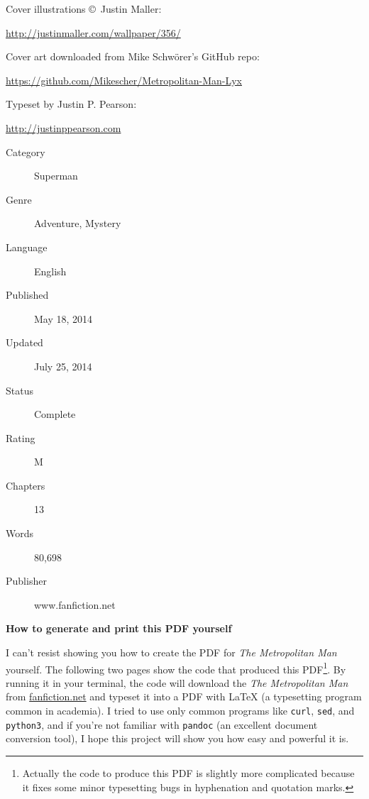 \documentclass[ebook,12pt]{memoir}
\begin{document}
\vspace{.2in}

\noindent Cover illustrations \copyright\ Justin Maller:

\url{http://justinmaller.com/wallpaper/356/}

\vspace{.2in}

\noindent Cover art downloaded from Mike Schw\"orer's GitHub repo:

\url{https://github.com/Mikescher/Metropolitan-Man-Lyx}

\vspace{.2in}

\noindent Typeset by Justin P. Pearson:

\url{http://justinppearson.com}


\vfill

\begin{description}
    \item[Category] Superman
    \item[Genre] Adventure, Mystery 
    \item[Language] English 
    \item[Published] May 18, 2014
    \item[Updated] July 25, 2014
    \item[Status] Complete
    \item[Rating] M 
    \item[Chapters] 13 
    \item[Words] 80,698
    \item[Publisher] www.fanfiction.net 
\end{description}

\normalsize
\cleartorecto


\thispagestyle{empty}

\vspace*{2in}

\textbf{How to generate and print this PDF yourself}

\vspace*{.5cm}

\footnotesize

I can't resist showing you how to create the PDF for \emph{The Metropolitan Man} yourself. 
The following two pages show the code that produced this 
PDF\footnote{ \tiny{Actually the code to produce this PDF is slightly more complicated 
because it fixes some minor typesetting bugs in hyphenation and quotation marks.}}. 
By running it in your terminal, the code will
download the \emph{The Metropolitan Man} from \url{fanfiction.net} 
and typeset it into a PDF with LaTeX (a typesetting program common in academia).
I tried to use only common programs like \texttt{curl}, \texttt{sed}, and \texttt{python3},
and if you're not familiar with \texttt{pandoc} (an excellent document conversion tool), 
I hope this project will show you how easy and powerful it is.
\end{document}
